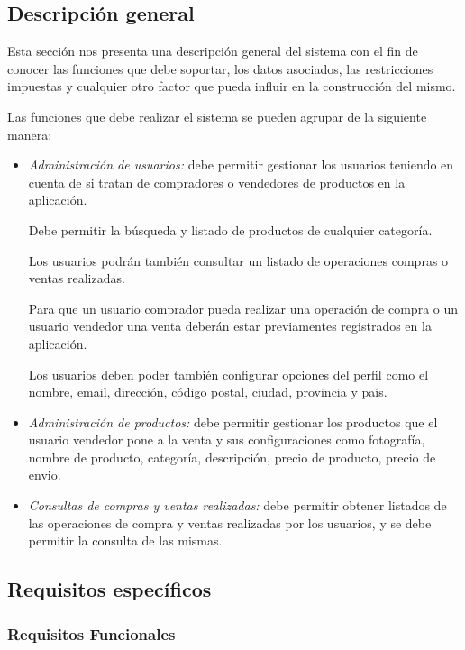  \subsection{Descripción general}

    Esta sección nos presenta una descripción general del sistema con el fin de conocer las funciones que debe soportar, los datos asociados, las restricciones impuestas y cualquier otro factor que pueda influir en la construcción del mismo.

Las funciones que debe realizar el sistema se pueden agrupar de la siguiente manera:

  \begin{itemize}
  
  \item \emph{Administración de usuarios:} debe permitir gestionar los usuarios teniendo en cuenta de si tratan de compradores o vendedores de productos en la aplicación.

    Debe permitir la búsqueda y listado de productos de cualquier categoría.

    Los usuarios podrán también consultar un listado de operaciones compras o ventas realizadas.
    
    Para que un usuario comprador pueda realizar una operación de compra o un usuario vendedor una venta deberán estar previamentes registrados en la aplicación.

    Los usuarios deben poder también configurar opciones del perfil como el nombre, email, dirección, código postal, ciudad, provincia y país.
  
  \item \emph{Administración de productos:} debe permitir gestionar los productos que el usuario vendedor pone a la venta y sus configuraciones como fotografía, nombre de producto, categoría, descripción, precio de producto, precio de envio.
  
  \item \emph{Consultas de compras y ventas realizadas:} debe permitir obtener listados de las operaciones de compra y ventas realizadas por los usuarios, y se debe permitir la consulta de las mismas.
  
  \end{itemize}

 \subsection{Requisitos específicos}
        \subsubsection{Requisitos Funcionales}
        

